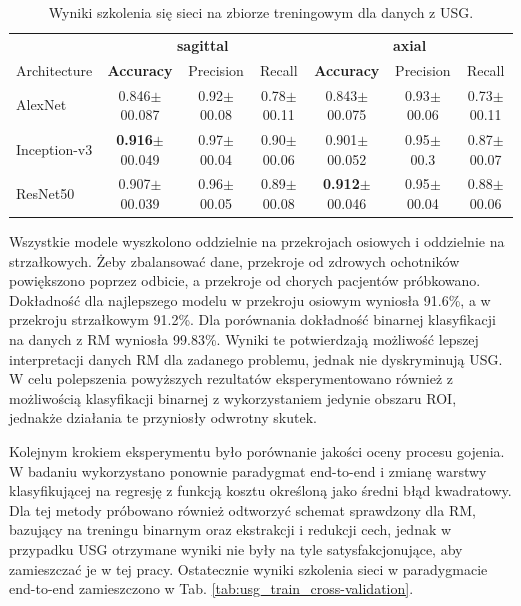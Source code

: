 \begin{table}[t!]
	\scriptsize
	\centering
	\setlength{\tabcolsep}{3pt}
	\setlength\extrarowheight{2pt}
	\caption{Wyniki szkolenia się sieci na zbiorze treningowym dla danych z USG.}
	\label{tab:usg-binary}
	\begin{tabular}{l||c|c|c||c|c|c}
		& \multicolumn{3}{c}{\footnotesize{\textbf{sagittal}}} & \multicolumn{3}{c}{\footnotesize{\textbf{axial}}} \\
		Architecture & \textbf{Accuracy} & Precision & Recall & \textbf{Accuracy} & Precision & Recall \\ \hline
		AlexNet & 0.846$\pm$00.087 & 0.92$\pm$00.08 & 0.78$\pm$00.11 & 0.843$\pm$00.075 & 0.93$\pm$00.06 & 0.73$\pm$00.11  \\ \hline
		Inception-v3 & \textbf{0.916}$\pm$00.049 & 0.97$\pm$00.04 & 0.90$\pm$00.06 & 0.901$\pm$00.052 & 0.95$\pm$00.3 & 0.87$\pm$00.07 \\ \hline
		ResNet50 & 0.907$\pm$00.039 & 0.96$\pm$00.05 & 0.89$\pm$00.08 & \textbf{0.912}$\pm$00.046 & 0.95$\pm$00.04 & 0.88$\pm$00.06 \\ \hline
	\end{tabular}
\end{table}

Wszystkie modele wyszkolono oddzielnie na przekrojach osiowych i oddzielnie na strzałkowych. Żeby zbalansować dane, przekroje od zdrowych ochotników powiększono poprzez odbicie, a przekroje od chorych pacjentów próbkowano. Dokładność dla najlepszego modelu w przekroju osiowym wyniosła 91.6\%, a w przekroju strzałkowym 91.2\%. Dla porównania dokładność binarnej klasyfikacji na danych z RM wyniosła 99.83\%. Wyniki te potwierdzają możliwość lepszej interpretacji danych RM dla zadanego problemu, jednak nie dyskryminują USG. W celu polepszenia powyższych rezultatów eksperymentowano również z możliwością klasyfikacji binarnej z wykorzystaniem jedynie obszaru ROI, jednakże działania te przyniosły odwrotny skutek.  

Kolejnym krokiem eksperymentu było porównanie jakości oceny procesu gojenia. W badaniu wykorzystano ponownie paradygmat end-to-end i zmianę warstwy klasyfikującej na regresję z funkcją kosztu określoną jako średni błąd kwadratowy. Dla tej metody próbowano również odtworzyć schemat sprawdzony dla RM, bazujący na treningu binarnym oraz ekstrakcji i redukcji cech, jednak w przypadku USG otrzymane wyniki nie były na tyle satysfakcjonujące, aby zamieszczać je w tej pracy. Ostatecznie wyniki szkolenia sieci w paradygmacie end-to-end zamieszczono w Tab. \ref{tab:usg_train_cross-validation}.

